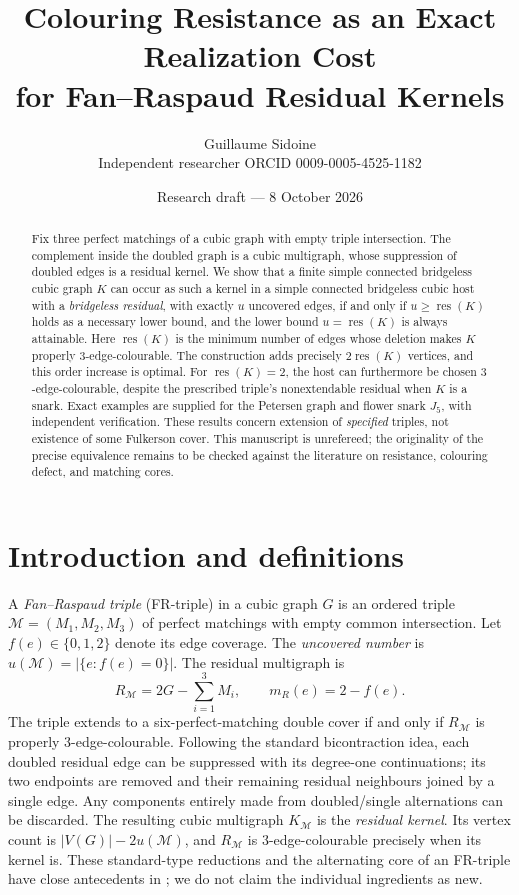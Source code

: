 \documentclass[11pt]{article}
\title{Colouring Resistance as an Exact Realization Cost\\for Fan--Raspaud Residual Kernels}
\author{Guillaume Sidoine\\\small Independent researcher \quad ORCID 0009-0005-4525-1182}
\date{Research draft --- 8 October 2026}
\newcommand{\rc}{\operatorname{res}}
\begin{document}
\maketitle
\begin{abstract}
Fix three perfect matchings of a cubic graph with empty triple intersection. The complement inside the doubled graph is a cubic multigraph, whose suppression of doubled edges is a residual kernel. We show that a finite simple connected bridgeless cubic graph $K$ can occur as such a kernel in a simple connected bridgeless cubic host with a \emph{bridgeless residual}, with exactly $u$ uncovered edges, if and only if $u\geq\rc(K)$ holds as a necessary lower bound, and the lower bound $u=\rc(K)$ is always attainable. Here $\rc(K)$ is the minimum number of edges whose deletion makes $K$ properly $3$-edge-colourable. The construction adds precisely $2\rc(K)$ vertices, and this order increase is optimal. For $\rc(K)=2$, the host can furthermore be chosen $3$-edge-colourable, despite the prescribed triple's nonextendable residual when $K$ is a snark. Exact examples are supplied for the Petersen graph and flower snark $J_5$, with independent verification. These results concern extension of \emph{specified} triples, not existence of some Fulkerson cover. This manuscript is unrefereed; the originality of the precise equivalence remains to be checked against the literature on resistance, colouring defect, and matching cores.
\end{abstract}

\section{Introduction and definitions}
A \emph{Fan--Raspaud triple} (FR-triple) in a cubic graph $G$ is an ordered triple $\mathcal M=(M_1,M_2,M_3)$ of perfect matchings with empty common intersection. Let $f(e)\in\{0,1,2\}$ denote its edge coverage. The \emph{uncovered number} is $u(\mathcal M)=|\{e:f(e)=0\}|$. The residual multigraph is
\[
R_{\mathcal M}=2G-\sum_{i=1}^3 M_i,\qquad m_R(e)=2-f(e).
\]
The triple extends to a six-perfect-matching double cover if and only if $R_{\mathcal M}$ is properly $3$-edge-colourable. Following the standard bicontraction idea, each doubled residual edge can be suppressed with its degree-one continuations; its two endpoints are removed and their remaining residual neighbours joined by a single edge. Any components entirely made from doubled/single alternations can be discarded. The resulting cubic multigraph $K_{\mathcal M}$ is the \emph{residual kernel}. Its vertex count is $|V(G)|-2u(\mathcal M)$, and $R_{\mathcal M}$ is $3$-edge-colourable precisely when its kernel is. These standard-type reductions and the alternating core of an FR-triple have close antecedents in \cite{FV09,LW18,Karabas24}; we do not claim the individual ingredients as new.
\end{document}
